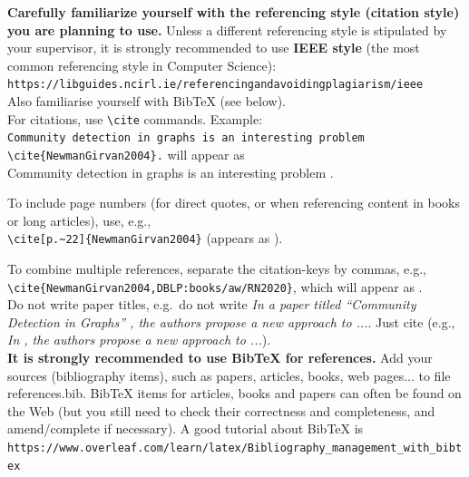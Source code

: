 \documentclass[a4paper,12pt]{Classes/RoboticsLaTeX}
\begin{document}
	
		\textbf{Carefully familiarize yourself with the referencing style (citation style) you are planning to use.} Unless a different referencing style is stipulated by your supervisor, it is strongly recommended to use \textbf{IEEE style} (the most common referencing style in Computer Science):\\ \verb#https://libguides.ncirl.ie/referencingandavoidingplagiarism/ieee#\\
	
	\noindent Also familiarise yourself with BibTeX (see below).\\
	
	For citations, use \verb#\cite# commands. Example:\\
	\verb#Community detection in graphs is an interesting problem \cite{NewmanGirvan2004}.#
	will appear as\\
	Community detection in graphs is an interesting problem \cite{NewmanGirvan2004}.
	
	To include page numbers (for direct quotes, or when referencing content in books or long articles), use, e.g.,\\ \noindent \verb#\cite[p.~22]{NewmanGirvan2004}# (appears as \cite[p.~22]{NewmanGirvan2004}).
	
	To combine multiple references, separate the citation-keys by commas, e.g.,\\ 
	\noindent \verb#\cite{NewmanGirvan2004,DBLP:books/aw/RN2020}#, which will appear as \cite{NewmanGirvan2004,DBLP:books/aw/RN2020}.\\
	
 Do not write paper titles, e.g.~do not write {\em In a paper titled ``Community Detection in Graphs'' \cite{NewmanGirvan2004}, the authors propose a new approach to ...}. Just cite (e.g., {\em In \cite{NewmanGirvan2004}, the authors propose a new approach to ...}).\\
	
	
	\textbf{It is strongly recommended to use BibTeX for references.} Add your sources (bibliography items), such as papers, articles, books, web pages... to file references.bib. BibTeX items for articles, books and papers can often be found on the Web (but you still need to check their correctness and completeness, and amend/complete if necessary). A good tutorial about BibTeX is\\
	\verb#https://www.overleaf.com/learn/latex/Bibliography_management_with_bibtex#
	
\end{document}
